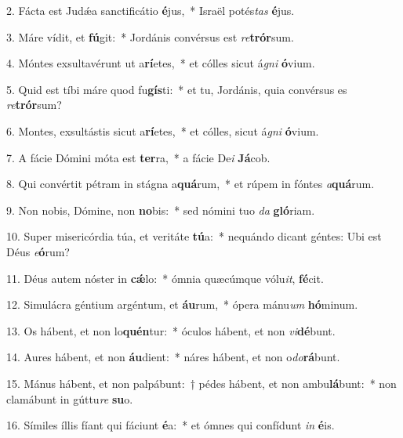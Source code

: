 \item 2. Fácta est Judǽa sanctificátio \textbf{é}jus,~* Israël potés\textit{tas} \textbf{é}jus.

\item 3. Máre vídit, et \textbf{fú}git:~* Jordánis convérsus est \textit{re}\textbf{trór}sum.

\item 4. Móntes exsultavérunt ut a\textbf{rí}etes,~* et cólles sicut á\textit{gni} \textbf{ó}vium.

\item 5. Quid est tíbi máre quod fu\textbf{gís}ti:~* et tu, Jordánis, quia convérsus es \textit{re}\textbf{trór}sum?

\item 6. Montes, exsultástis sicut a\textbf{rí}etes,~* et cólles, sicut á\textit{gni} \textbf{ó}vium.

\item 7. A fácie Dómini móta est \textbf{ter}ra,~* a fácie De\textit{i} \textbf{Já}cob.

\item 8. Qui convértit pétram in stágna a\textbf{quá}rum,~* et rúpem in fóntes \textit{a}\textbf{quá}rum.

\item 9. Non nobis, Dómine, non \textbf{no}bis:~* sed nómini tuo \textit{da} \textbf{gló}riam.

\item 10. Super misericórdia túa, et veritáte \textbf{tú}a:~* nequándo dicant géntes: Ubi est Déus \textit{e}\textbf{ó}rum?

\item 11. Déus autem nóster in \textbf{cǽ}lo:~* ómnia quæcúmque vólu\textit{it}, \textbf{fé}cit.

\item 12. Simulácra géntium argéntum, et \textbf{áu}rum,~* ópera mánu\textit{um} \textbf{hó}minum.

\item 13. Os hábent, et non lo\textbf{quén}tur:~* óculos hábent, et non \textit{vi}\textbf{dé}bunt.

\item 14. Aures hábent, et non \textbf{áu}dient:~* náres hábent, et non o\textit{do}\textbf{rá}bunt.

\item 15. Mánus hábent, et non palpábunt:~† pédes hábent, et non ambu\textbf{lá}bunt:~* non clamábunt in gúttu\textit{re} \textbf{su}o.

\item 16. Símiles íllis fíant qui fáciunt \textbf{é}a:~* et ómnes qui confídunt \textit{in} \textbf{é}is.

